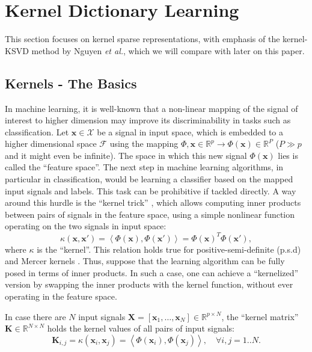 \documentclass[journal]{IEEEtran}
\newcommand{\bx}{\mathbf{x}}
\newcommand{\bX}{\mathbf{X}}
\newcommand{\cX}{\mathcal{X}}
\newcommand{\cF}{\mathcal{F}}
\newcommand{\bK}{\mathbf{K}}
\begin{document}
\section{Kernel Dictionary Learning}\label{KDL}

This section focuses on kernel sparse representations, with emphasis of the kernel-KSVD method by Nguyen \textit{et al.}, which we will compare with later on this paper.

\subsection{Kernels - The Basics} \label{SS:Kernels}

In machine learning, it is well-known that a non-linear mapping of the signal of interest to higher dimension may improve its discriminability in tasks such as classification. Let $\bx \in \cX$ be a signal in input space, which is embedded to a higher dimensional space $\cF$ using the mapping $\Phi, \bx \in \mathbb{R}^{p} \rightarrow \Phi(\bx) \in \mathbb{R}^{P}$ ($P \gg p$ and it might even be infinite). The space in which this new signal $\Phi(\bx)$ lies is called the ``feature space''. The next step in machine learning algorithms, in particular in classification, would be learning a classifier based on the mapped input signals and labels. This task can be prohibitive if tackled directly. A way around this hurdle is the ``kernel trick'' \cite{RKHS,Kernels}, which allows computing inner products between pairs of signals in the feature space, using a simple nonlinear function operating on the two signals in input space:
\begin{equation}\label{eq:Kernel}
\kappa\left(\bx,\bx'\right)=\left<\Phi(\bx),\Phi(\bx')\right>=\Phi(\bx)^T\Phi(\bx'),
\end{equation}
where $\kappa$ is the ``kernel''. This relation holds true for positive-semi-definite (p.s.d) and Mercer kernels \cite{KSVM}. Thus, suppose that the learning algorithm can be fully posed in terms of inner products. In such a case, one can achieve a ``kernelized'' version by swapping the inner products with the kernel function, without ever operating in the feature space.

In case there are $N$ input signals $\bX = [\bx_1,\ldots,\bx_N] \in \mathbb{R}^{p \times N}$, the ``kernel matrix'' $\bK \in \mathbb{R}^{N \times N}$ holds the kernel values of all pairs of input signals:
\begin{equation}\label{eq:KernelMat}
\bK_{i,j} = \kappa(\bx_i,\bx_j) = \left<\Phi(\bx_i),\Phi(\bx_j)\right>, \quad \forall i,j = 1..N.
\end{equation}
\end{document}
